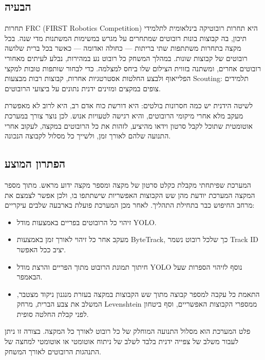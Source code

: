 \subsection{הבעיה}

תחרות \textenglish{FRC (FIRST Robotics Competition)} היא תחרות
רובוטיקה בינלאומית לתלמידי תיכון, בה קבוצות בונות רובוטים שמתחרים על
מגרש במשימות המשתנות מדי שנה. בכל מקצה בתחרות משתתפות שתי בריתות —
כחולה ואדומה — כאשר בכל ברית שלושה רובוטים של קבוצות שונות. במהלך
המשחק כל רובוט נע במהירות, נבלע לעיתים מאחורי רובוטים אחרים, ומשתנה
בזווית הצילום שלו ביחס למצלמה. כדי לבחור שותפות טובות למקצי הפלייאוף
ולבצע החלטות אסטרטגיות אחרות, קבוצות רבות מבצעות
\textenglish{Scouting}: תלמידים צופים במקצים ומזינים ידנית נתונים על
ביצועי הרובוטים.

לשיטה הידנית יש כמה חסרונות בולטים: היא דורשת כוח אדם רב, היא לרוב לא
מאפשרת מעקב מלא אחרי מיקומי הרובוטים, והיא רגישה לטעויות אנוש. לכן
נוצר צורך במערכת אוטומטית שתוכל לקבל סרטון וידאו מהיציע, לזהות את כל
הרובוטים במקצה, לעקוב אחרי התנועה שלהם לאורך זמן, ולשייך כל מסלול
לקבוצה הנכונה.

\subsection{הפתרון המוצע}

המערכת שפיתחתי מקבלת כקלט סרטון של מקצה ומספר מקצה ידוע מראש. מתוך
מספר המקצה המערכת יודעת מהן שש הקבוצות האפשריות שישתתפו בו, ולכן אפשר
לצמצם את מרחב החיפוש כבר בתחילת התהליך. לאחר מכן המערכת פועלת בארבעה
שלבים עיקריים:

\begin{itemize}
\item זיהוי כל הרובוטים בפריים באמצעות מודל \textenglish{YOLO}.
\item מעקב אחר כל זיהוי לאורך זמן באמצעות \textenglish{ByteTrack}, כך
  שלכל רובוט נשמר \textenglish{Track ID} יציב ככל האפשר.
\item חיתוך תמונת הרובוט מתוך הפריים והרצת מודל \textenglish{YOLO}
  נוסף לזיהוי הספרות שעל הבאמפר.
\item התאמת כל עקבה למספר קבוצה מתוך שש הקבוצות במקצה בעזרת מנגנון
  ניקוד מצטבר, המשלב את צבע הברית, מרחק \textenglish{Levenshtein}
  ממספרי הקבוצות האפשריים, וסף ביטחון לפני קבלת החלטה סופית.
\end{itemize}

פלט המערכת הוא מסלול התנועה המוחלק של כל רובוט לאורך כל המקצה. בצורה
זו ניתן לעבור משלב של צפייה ידנית בלבד לשלב של ניתוח אוטומטי או
אוטומטי למחצה של התנהגות הרובוטים לאורך המשחק.

